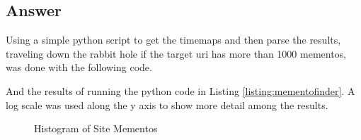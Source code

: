 \subsection{Answer}
Using a simple python script to get the timemaps and then parse the results, traveling down the rabbit hole if the target uri has more than 1000 mementos, was done with the following code.



And the results of running the python code in Listing \ref{listing:mementofinder}. A log scale was used along the y axis to show more detail among the results. 

\begin{figure}[h!]
\centering
\label{fig:hist_ss}
\caption{Histogram of Site Mementos}
\end{figure}
